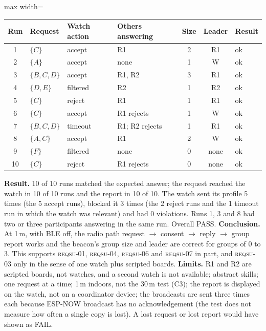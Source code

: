 \IfFileExists{IEEEtran.cls}{\documentclass[conference]{IEEEtran}}{\documentclass[10pt,twocolumn]{article}}
\newcommand{\req}[1]{\textsc{reqsu-}#1}
\newcommand{\fitcol}[1]{\begin{adjustbox}{max width=\columnwidth}#1\end{adjustbox}}
\begin{document}
\begin{center}\footnotesize\setlength{\tabcolsep}{3pt}
\fitcol{\begin{tabular}{@{}c l l l c c l@{}}
\toprule
Run & Request & Watch action & Others answering & Size & Leader & Result\\
\midrule
1 & $\{C\}$ & accept & R1 & 2 & R1 & ok\\
2 & $\{A\}$ & accept & none & 1 & W & ok\\
3 & $\{B,C,D\}$ & accept & R1, R2 & 3 & R1 & ok\\
4 & $\{D,E\}$ & filtered & R2 & 1 & R2 & ok\\
5 & $\{C\}$ & reject & R1 & 1 & R1 & ok\\
6 & $\{C\}$ & accept & R1 rejects & 1 & W & ok\\
7 & $\{B,C,D\}$ & timeout & R1; R2 rejects & 1 & R1 & ok\\
8 & $\{A,C\}$ & accept & R1 & 2 & W & ok\\
9 & $\{F\}$ & filtered & none & 0 & none & ok\\
10 & $\{C\}$ & reject & R1 rejects & 0 & none & ok\\
\bottomrule
\end{tabular}}
\end{center}
\textbf{Result.} 10 of 10 runs matched the expected answer; the request reached the watch in 10 of 10 runs and the report in 10 of 10. The watch sent its profile 5 times (the 5 accept runs), blocked it 3 times (the 2 reject runs and the 1 timeout run in which the watch was relevant) and had 0 violations. Runs 1, 3 and 8 had two or three participants answering in the same run. Overall PASS. \textbf{Conclusion.} At 1\,m, with BLE off, the radio path request $\to$ consent $\to$ reply $\to$ group report works and the beacon's group size and leader are correct for groups of 0 to 3. This supports \req{01}, \req{04}, \req{06} and \req{07} in part, and \req{03} only in the sense of one watch plus scripted boards. \textbf{Limits.} R1 and R2 are scripted boards, not watches, and a second watch is not available; abstract skills; one request at a time; 1\,m indoors, not the 30\,m test (C3); the report is displayed on the watch, not on a coordinator device; the broadcasts are sent three times each because ESP-NOW broadcast has no acknowledgement (the test does not measure how often a single copy is lost). A lost request or lost report would have shown as FAIL.
\end{document}

